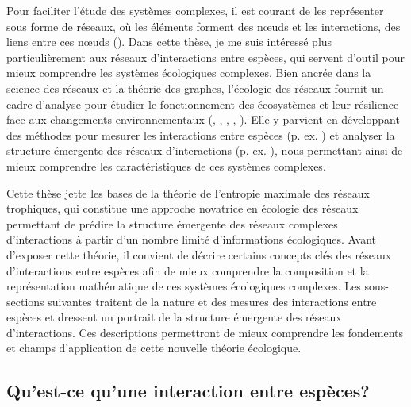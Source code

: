 Pour faciliter l'étude des systèmes complexes, il est courant de les représenter
sous forme de réseaux, où les éléments forment des nœuds et les interactions,
des liens entre ces nœuds (\cite{Newman2003Structure}). Dans cette thèse, je me
suis intéressé plus particulièrement aux réseaux d'interactions entre espèces,
qui servent d'outil pour mieux comprendre les systèmes écologiques complexes.
Bien ancrée dans la science des réseaux et la théorie des graphes, l'écologie
des réseaux fournit un cadre d'analyse pour étudier le fonctionnement des
écosystèmes et leur résilience face aux changements environnementaux
(\cite{Proulx2005Network}, \cite{McCann2007Protecting}, \cite{McCann2011Food},
\cite{Rooney2012Integrating}, \cite{Valiente-Banuet2019Species}). Elle y
parvient en développant des méthodes pour mesurer les interactions entre espèces
(p. ex. \cite{Jordano2016Sampling}) et analyser la structure émergente des
réseaux d'interactions (p. ex. \cite{Delmas2019Analysing}), nous permettant
ainsi de mieux comprendre les caractéristiques de ces systèmes complexes. 

Cette thèse jette les bases de la théorie de l'entropie maximale des réseaux
trophiques, qui constitue une approche novatrice en écologie des réseaux
permettant de prédire la structure émergente des réseaux complexes
d'interactions à partir d'un nombre limité d'informations écologiques. Avant
d'exposer cette théorie, il convient de décrire certains concepts clés des
réseaux d'interactions entre espèces afin de mieux comprendre la composition et
la représentation mathématique de ces systèmes écologiques complexes. Les sous-sections
suivantes traitent de la nature et des mesures des interactions entre espèces et
dressent un portrait de la structure émergente des réseaux d'interactions. Ces
descriptions permettront de mieux comprendre les fondements et champs d'application
de cette nouvelle théorie écologique.

\subsection{Qu'est-ce qu'une interaction entre espèces?} 

